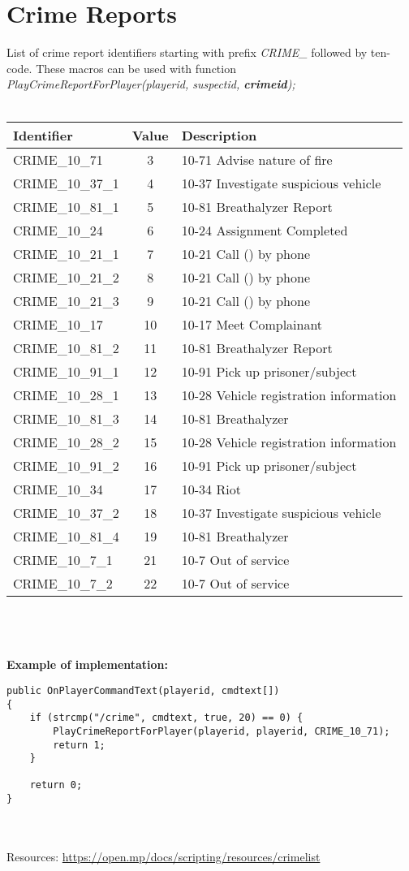 \documentclass{article}
\begin{document}
\section{Crime Reports}
List of crime report identifiers starting with prefix \textit{CRIME\_} followed by ten-code. These macros can be used with function \textit{PlayCrimeReportForPlayer(playerid, suspectid, \textbf{crimeid});}
\\
\\
\begin{tabular}{ |l|c|l| } 
\hline
Identifier & Value & Description \\
\hline
CRIME\_10\_71 & 3 & 10-71 Advise nature of fire \\
CRIME\_10\_37\_1 & 4 & 10-37 Investigate suspicious vehicle \\
CRIME\_10\_81\_1 & 5 & 10-81 Breathalyzer Report \\
CRIME\_10\_24 & 6 & 10-24 Assignment Completed \\
CRIME\_10\_21\_1 & 7 & 10-21 Call () by phone \\
CRIME\_10\_21\_2 & 8 & 10-21 Call () by phone \\
CRIME\_10\_21\_3 & 9 & 10-21 Call () by phone \\
CRIME\_10\_17 & 10 & 10-17 Meet Complainant \\
CRIME\_10\_81\_2 & 11 & 10-81 Breathalyzer Report \\
CRIME\_10\_91\_1 & 12 & 10-91 Pick up prisoner/subject \\
CRIME\_10\_28\_1 & 13 & 10-28 Vehicle registration information \\
CRIME\_10\_81\_3 & 14 & 10-81 Breathalyzer \\
CRIME\_10\_28\_2 & 15 & 10-28 Vehicle registration information \\
CRIME\_10\_91\_2 & 16 & 10-91 Pick up prisoner/subject \\
CRIME\_10\_34 & 17 & 10-34 Riot \\
CRIME\_10\_37\_2 & 18 & 10-37 Investigate suspicious vehicle \\
CRIME\_10\_81\_4 & 19 & 10-81 Breathalyzer \\
CRIME\_10\_7\_1 & 21 & 10-7 Out of service \\
CRIME\_10\_7\_2 & 22 & 10-7 Out of service \\
\hline
\end{tabular}
\\
\\
\\\textbf{Example of implementation:}
\begin{verbatim}
public OnPlayerCommandText(playerid, cmdtext[])
{
    if (strcmp("/crime", cmdtext, true, 20) == 0) {
        PlayCrimeReportForPlayer(playerid, playerid, CRIME_10_71);
        return 1;
    }

    return 0;
}
\end{verbatim}
\\
\\Resources: \url{https://open.mp/docs/scripting/resources/crimelist}
\end{document}
